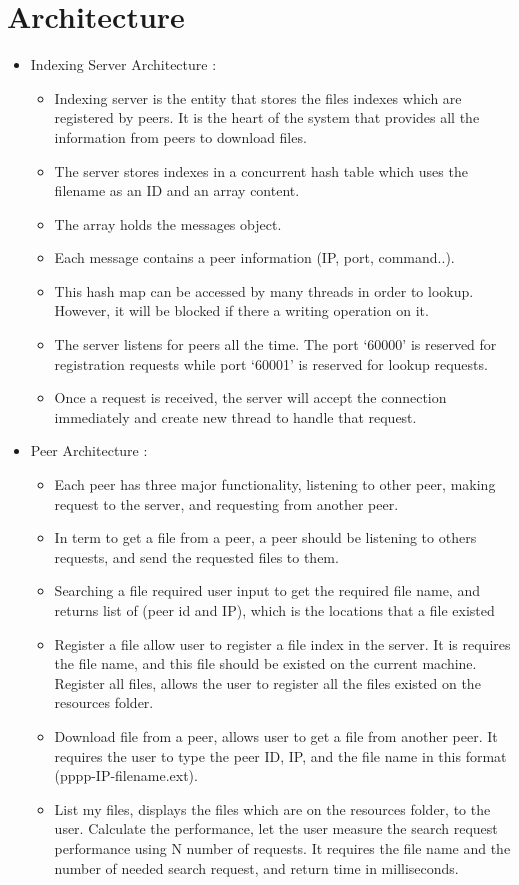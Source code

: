 \documentclass{article}
\begin{document}
\section{Architecture}
\begin{itemize}
\item Indexing Server Architecture :
\begin{itemize}
\item Indexing server is the entity that stores the files indexes which are registered by
peers. It is the heart of the system that provides all the information from peers to
download files.
\item The server stores indexes in a concurrent hash table which uses the filename as an
ID and an array content.
\item The array holds the messages object.
\item Each message contains a peer information (IP, port, command..).
\item This hash map can be accessed by many threads in order to lookup. However, it
will be blocked if there a writing operation on it.
\item The server listens for peers all the time. The port ‘60000’ is reserved for registration requests while port ‘60001’ is reserved for lookup requests.
\item Once a request is received, the server will accept the connection immediately and create new thread to handle that request.
\end{itemize}
\item Peer Architecture :
\begin{itemize}
\item Each peer has three major functionality, listening to other peer, making request to
the server, and requesting from another peer.
\item In term to get a file from a peer, a peer should be listening to others requests, and
send the requested files to them.
\item Searching a file required user input to get the required file name, and returns list of (peer id and IP), which is the locations that a file existed
\item Register a file allow user to register a file index in the server. It is requires the file name, and this file should be existed on the current machine.
Register all files, allows the user to register all the files existed on the resources folder.
\item Download file from a peer, allows user to get a file from another peer. It requires the user to type the peer ID, IP, and the file name in this format (pppp-IP-filename.ext).
\item List my files, displays the files which are on the resources folder, to the user.
Calculate the performance, let the user measure the search request performance using N number of requests. It requires the file name and the number of needed
search request, and return time in milliseconds. \\ \\ \\
\end{itemize}
\end{itemize}
\end{document}
